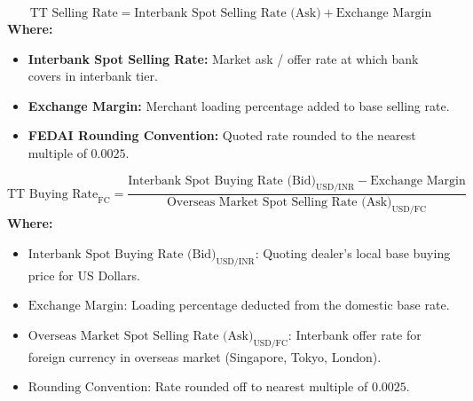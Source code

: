 \begin{formulabox}
\begin{equation*}
    \text{TT Selling Rate} = \text{Interbank Spot Selling Rate (Ask)} + \text{Exchange Margin}
\end{equation*}
\textbf{Where:}
\begin{itemize}[leftmargin=*, noitemsep]
    \item \textbf{Interbank Spot Selling Rate:} Market ask / offer rate at which bank covers in interbank tier.
    \item \textbf{Exchange Margin:} Merchant loading percentage added to base selling rate.
    \item \textbf{FEDAI Rounding Convention:} Quoted rate rounded to the nearest multiple of $0.0025$.
\end{itemize}
\end{formulabox}

\begin{formulabox}
\begin{equation*}
    \text{TT Buying Rate}_{\text{FC}} = \frac{\text{Interbank Spot Buying Rate (Bid)}_{\text{USD/INR}} - \text{Exchange Margin}}{\text{Overseas Market Spot Selling Rate (Ask)}_{\text{USD/FC}}}
\end{equation*}
\textbf{Where:}
\begin{itemize}[leftmargin=*, noitemsep]
    \item $\text{Interbank Spot Buying Rate (Bid)}_{\text{USD/INR}}$: Quoting dealer's local base buying price for US Dollars.
    \item $\text{Exchange Margin}$: Loading percentage deducted from the domestic base rate.
    \item $\text{Overseas Market Spot Selling Rate (Ask)}_{\text{USD/FC}}$: Interbank offer rate for foreign currency in overseas market (Singapore, Tokyo, London).
    \item $\text{Rounding Convention}$: Rate rounded off to nearest multiple of $0.0025$.
\end{itemize}
\end{formulabox}

